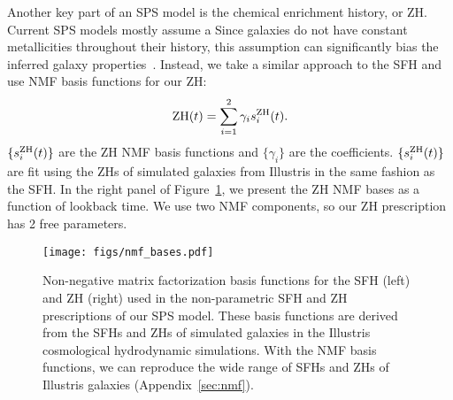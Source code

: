 Another key part of an SPS model is the chemical enrichment history, or ZH. 
Current SPS models mostly assume a
Since galaxies do not have constant metallicities throughout their history,
this assumption can significantly bias the inferred galaxy
properties~\citep{thorne2021}. 
Instead, we take a similar approach to the SFH and use NMF basis functions for
our ZH:
\begin{equation}
    {\rm ZH}(t) = \sum\limits_{i=1}^2 \gamma_i s_i^{\rm ZH}(t).
\end{equation} 
$\{s_i^{\rm ZH}(t)\}$ are the ZH NMF basis functions and $\{\gamma_i\}$ are the
coefficients. 
$\{s_i^{\rm ZH}(t)\}$ are fit using the ZHs of simulated galaxies from
Illustris in the same fashion as the SFH. 
In the right panel of Figure~\ref{fig:nmf}, we present the ZH NMF bases as a
function of lookback time. 
We use two NMF components, so our ZH prescription has 2 free parameters. 

\begin{figure}
\begin{center}
\texttt{[image: figs/nmf\_bases.pdf]} 
    \caption{
        Non-negative matrix factorization basis functions for the SFH (left)
        and ZH (right) used in the non-parametric SFH and ZH prescriptions of
        our SPS model. 
        These basis functions are derived from the SFHs and ZHs of simulated
        galaxies in the Illustris cosmological hydrodynamic simulations. 
        With the NMF basis functions, we can reproduce the wide range of SFHs
        and ZHs of Illustris galaxies (Appendix~\ref{sec:nmf}).  
    }
    \label{fig:nmf}
\end{center}
\end{figure}

